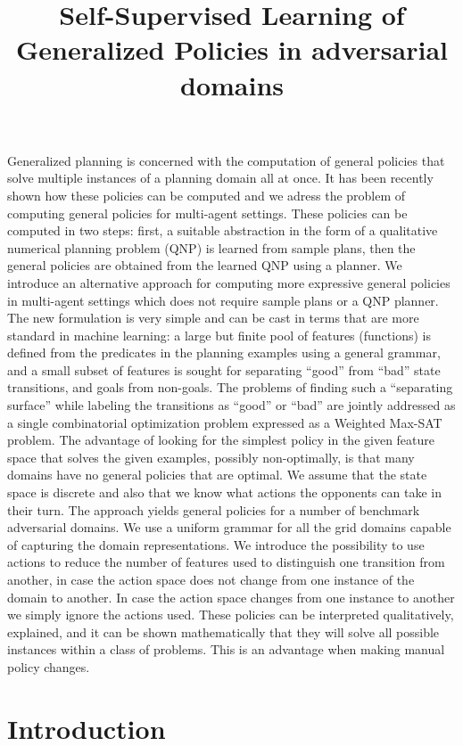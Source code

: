 \documentclass[a4paper]{article}
\title{Self-Supervised Learning of Generalized Policies in adversarial domains}
\begin{document}
\maketitle


\abstract

Generalized planning is concerned with the computation of general policies that solve multiple instances of a planning domain all at once. It has been recently shown how these policies can be computed and we adress the problem of computing general policies for multi-agent settings. These policies can be computed in two steps: first, a suitable abstraction in the form of a qualitative numerical planning problem (QNP) is learned from sample plans, then the general policies are obtained from the learned QNP using a planner. We introduce an alternative approach for computing more expressive general policies in multi-agent settings which does not require sample plans or a QNP planner. The new formulation is very simple and can be cast in terms that are more standard in machine learning: a large but finite pool of features (functions) is defined from the predicates in the planning examples using a general grammar, and a small subset of features is sought for separating “good” from “bad” state transitions, and goals from non-goals. The problems of finding such a “separating surface” while labeling the transitions as “good” or “bad” are jointly addressed as a single combinatorial optimization problem expressed as a Weighted Max-SAT problem. The advantage of looking for the simplest policy in the given feature space that solves the given examples, possibly non-optimally, is that many domains have no general policies that are optimal. We assume that the state space is discrete and also that we know what actions the opponents can take in their turn. The approach yields general policies for a number of benchmark adversarial domains. We use a uniform grammar for all the grid domains capable of capturing the domain representations. We introduce the possibility to use actions to reduce the number of features used to distinguish one transition from another, in case the action space does not change from one instance of the domain to another. In case the action space changes from one instance to another we simply ignore the actions used. These policies can be interpreted qualitatively, explained, and it can be shown mathematically that they will solve all possible instances within a class of problems. This is an advantage when making manual policy changes.

\section{Introduction}
\end{document}
